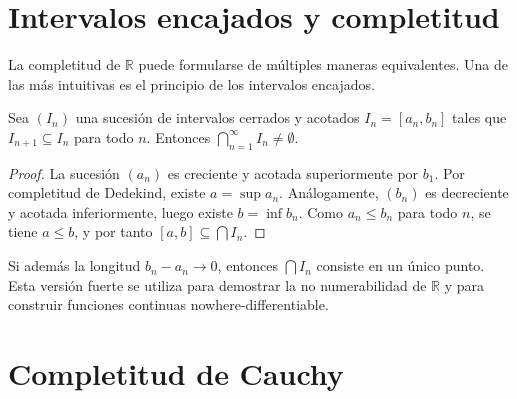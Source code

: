 \section{Intervalos encajados y completitud}

La completitud de $\mathbb{R}$ puede formularse de múltiples maneras equivalentes. Una de las más intuitivas es el principio de los intervalos encajados.

\begin{theorem}
\label{teo:intervalos-encajados}
Sea $(I_n)$ una sucesión de intervalos cerrados y acotados $I_n=[a_n,b_n]$ tales que $I_{n+1}\subseteq I_n$ para todo $n$. Entonces $\bigcap_{n=1}^{\infty} I_n\neq\emptyset$.
\end{theorem}

\begin{proof}
La sucesión $(a_n)$ es creciente y acotada superiormente por $b_1$. Por completitud de Dedekind, existe $a=\sup a_n$. Análogamente, $(b_n)$ es decreciente y acotada inferiormente, luego existe $b=\inf b_n$. Como $a_n\leq b_n$ para todo $n$, se tiene $a\leq b$, y por tanto $[a,b]\subseteq\bigcap I_n$.
\end{proof}

\begin{center}
\end{center}

\begin{remark}
Si además la longitud $b_n-a_n\to 0$, entonces $\bigcap I_n$ consiste en un único punto. Esta versión fuerte se utiliza para demostrar la no numerabilidad de $\mathbb{R}$ y para construir funciones continuas nowhere-differentiable.
\end{remark}

\section{Completitud de Cauchy}

